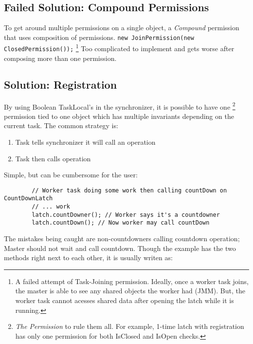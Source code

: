 \documentclass[11pt]{article}
\begin{document}
    \subsection{Failed Solution: Compound Permissions}
    To get around multiple permissions on a single object, a \textit{Compound} permission that uses
    composition of permissions. \lstinline{new JoinPermission(new ClosedPermission());}
    \footnote{A failed attempt of Task-Joining permission. Ideally, once a worker task joins, the master is able
    to see any shared objects the worker had (JMM). But, the worker task cannot acesses shared data after opening
    the latch while it is running.}
    Too complicated to implement and gets worse after composing more than one permission.

    \subsection{Solution: Registration}
    By using Boolean TaskLocal's in the synchronizer, it is possible to have one \footnote{
    \textit{The Permission} to rule them all. For example, 1-time latch with registration has only
    one permission for both IsClosed and IsOpen checks.
    }
    permission tied to one object which has multiple invariants depending on the current task. The common strategy
    is:
    \begin{enumerate}
        \item Task tells synchronizer it will call an operation
        \item Task then calls operation
    \end{enumerate}

    Simple, but can be cumbersome for the user:
    \begin{lstlisting}
        // Worker task doing some work then calling countDown on CountDownLatch
        // ... work
        latch.countDowner(); // Worker says it's a countdowner
        latch.countDown(); // Now worker may call countDown
    \end{lstlisting}

    The mistakes being caught are non-countdowners calling countdown operation; Master should not wait
    and call countdown. Though the example has the two methods right next to each other, it is usually
    writen as:
\end{document}
